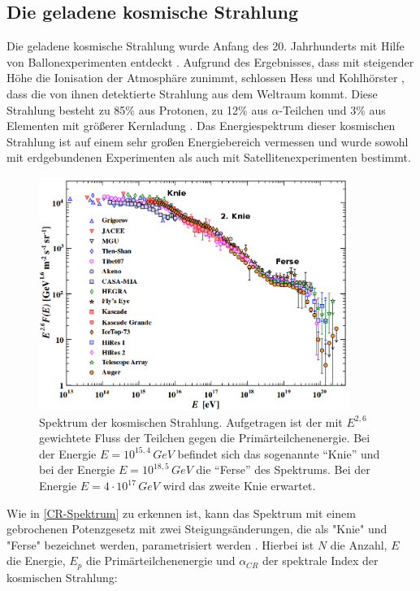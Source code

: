 \subsection{Die geladene kosmische Strahlung}
Die geladene kosmische Strahlung wurde Anfang des 20. Jahrhunderts mit Hilfe von Ballonexperimenten entdeckt \cite{Hess}.
Aufgrund des Ergebnisses, dass mit steigender Höhe die Ionisation der Atmosphäre zunimmt, schlossen Hess und Kohlhörster \cite{Kohlhoerster}, dass die von ihnen detektierte Strahlung aus dem Weltraum kommt.
Diese Strahlung besteht zu 85\% aus Protonen, zu 12\% aus $\alpha$-Teilchen und 3\% aus Elementen mit größerer Kernladung \cite{Grupen}.
Das Energiespektrum dieser kosmischen Strahlung ist auf einem sehr großen Energiebereich vermessen und wurde sowohl mit erdgebundenen Experimenten als auch mit Satellitenexperimenten bestimmt.


\begin{figure}
    \centering
    \includegraphics[width=0.9\textwidth]{./Plots/02_Astroteilchenphysik/CosmicRaySpectrum2.png}
    \caption{Spektrum der kosmischen Strahlung. 
      Aufgetragen ist der mit $E^{2,6}$ gewichtete Fluss der Teilchen gegen die Primärteilchenenergie. 
      Bei der Energie $E=10^{15,4}\,\si{GeV}$ befindet sich das sogenannte \enquote{Knie} und bei der Energie $E=10^{18,5}\,\si{GeV}$ die \enquote{Ferse} des Spektrums. 
      Bei der Energie $E=4\cdot 10^{17}\,\si{GeV}$ \cite{Knie} wird das zweite Knie erwartet.\cite{PDG}}
    \label{CR-Spektrum}
\end{figure}



Wie in \autoref{CR-Spektrum} zu erkennen ist, kann das Spektrum mit einem gebrochenen Potenzgesetz mit zwei Steigungsänderungen, die als "Knie" und "Ferse" bezeichnet werden, parametrisiert werden \cite{Knie}.
Hierbei ist $N$ die Anzahl, $E$ die Energie, $E_p$ die Primärteilchenenergie und $\alpha_{CR}$ der spektrale Index der kosmischen Strahlung:

